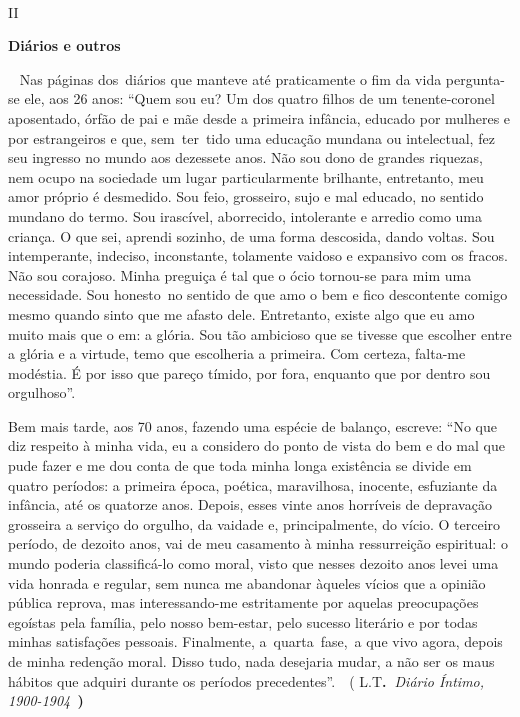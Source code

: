 ~

II

\textbf{Diários e outros}

~ Nas páginas dos~diários que manteve até praticamente o fim da vida
pergunta-se ele, aos 26 anos: ``Quem sou eu? Um dos quatro filhos de um
tenente-coronel aposentado, órfão de pai e mãe desde a primeira
infância, educado por mulheres e por estrangeiros e que, sem~ter~tido
uma educação mundana ou intelectual, fez seu ingresso no mundo aos
dezessete anos. Não sou dono de grandes riquezas, nem ocupo na sociedade
um lugar particularmente brilhante, entretanto, meu amor próprio é
desmedido. Sou feio, grosseiro, sujo e mal educado, no sentido mundano
do termo. Sou irascível, aborrecido, intolerante e arredio como uma
criança. O que sei, aprendi sozinho, de uma forma descosida, dando
voltas. Sou intemperante, indeciso, inconstante, tolamente vaidoso e
expansivo com os fracos. Não sou corajoso. Minha preguiça é tal que o
ócio tornou-se para mim uma necessidade. Sou honesto~no sentido de que
amo o bem e fico descontente comigo mesmo quando sinto que me afasto
dele. Entretanto, existe algo que eu amo muito mais que o em: a glória.
Sou tão ambicioso que se tivesse que escolher entre a glória e a
virtude, temo que escolheria a primeira. Com certeza, falta-me modéstia.
É por isso que pareço tímido, por fora, enquanto que por dentro sou
orgulhoso''.

Bem mais tarde, aos 70 anos, fazendo uma espécie de balanço, escreve:
``No que diz respeito à minha vida, eu a considero do ponto de vista do
bem e do mal que pude fazer e me dou conta de que toda minha longa
existência se divide em quatro períodos: a primeira época, poética,
maravilhosa, inocente, esfuziante da infância, até os quatorze anos.
Depois, esses vinte anos horríveis de depravação grosseira a serviço do
orgulho, da vaidade e, principalmente, do vício. O terceiro período, de
dezoito anos, vai de meu casamento à minha ressurreição espiritual: o
mundo poderia classificá-lo como moral, visto que nesses dezoito anos
levei uma vida honrada e regular, sem nunca me abandonar àqueles vícios
que a opinião pública reprova, mas interessando-me estritamente por
aquelas preocupações egoístas pela família, pelo nosso bem-estar, pelo
sucesso literário e por todas minhas satisfações pessoais. Finalmente,
a~quarta~fase,~a que vivo agora, depois de minha redenção moral. Disso
tudo, nada desejaria mudar, a não ser os maus hábitos que adquiri
durante os períodos precedentes''.~~( L.T\textbf{.~}\emph{Diário Íntimo,
1900-1904~}\textbf{)}

